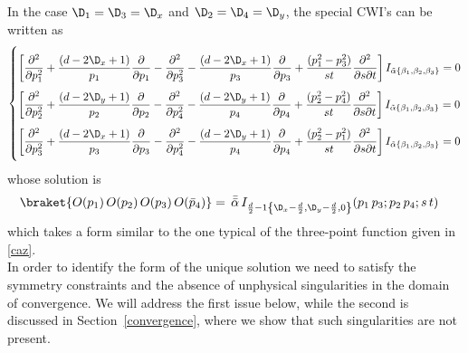 \documentclass[a4paper,11pt,openright,twoside]{book}
\let\a=\alpha   \let\b=\beta   \let\g=\gamma   \let\d=\delta
\newcommand{\secref}[1]{Section~\ref{#1}}		%
\numberwithin{equation}{section}
\begin{document}
{In the case $\D_1=\D_3=\D_x$ and $\D_2=\D_4=\D_y$, the special CWI's can be written as
\begin{equation}
	\left\{\begin{aligned}&\\[-1.9ex]
		&\bigg [\frac{\partial^2}{\partial p_1^2}+\frac{(d-2\D_x+1)}{p_1}\frac{\partial}{\partial p_1}-\frac{\partial^2}{\partial p_3^2}-\frac{(d-2\D_x+1)}{p_3}\frac{\partial}{\partial p_3}+\frac{(p_1^2-p_3^2)}{st}\frac{\partial^2}{\partial s\partial t}\bigg ]\,I_{\tilde\a\{\b_1,\b_2,\b_3\}}=0\\[1ex]
		&\bigg[\frac{\partial^2}{\partial p_2^2}+\frac{(d-2\D_y+1)}{p_2}\frac{\partial}{\partial p_2}-\frac{\partial^2}{\partial p_4^2}-\frac{(d-2\D_y+1)}{p_4}\frac{\partial}{\partial p_4}+\frac{(p_2^2-p_4^2)}{st}\frac{\partial^2}{\partial s\partial t}\bigg ]\,I_{\tilde\a\{\b_1,\b_2,\b_3\}}=0\\[1ex]
		&\bigg[\frac{\partial^2}{\partial p_3^2}+\frac{(d-2\D_x+1)}{p_3}\frac{\partial}{\partial p_3}-\frac{\partial^2}{\partial p_4^2}-\frac{(d-2\D_y+1)}{p_4}\frac{\partial}{\partial p_4}+\frac{(p_2^2-p_1^2)}{st}\frac{\partial^2}{\partial s\partial t}\bigg ]\,I_{\tilde\a\{\b_1,\b_2,\b_3\}}=0\\[1.3ex]
	\end{aligned}\right.
\end{equation}
whose solution is
\begin{align}
	\label{ssm1}
	\braket{O(p_1)\,O(p_2)\,O(p_3)\,O(\bar{p}_4)}&=\,\bar{\bar{\a}} \,I_{\frac{d}{2}-1\left\{\D_x-\frac{d}{2},\D_y-\frac{d}{2},0\right\}}(p_1\, p_3;p_2\,p_4; s\,t)
\end{align}
which takes a form similar to the one typical of the three-point function given in \eqref{caz}.\\
In order to identify the form of the unique solution we need to satisfy the symmetry constraints and the absence of unphysical singularities \cite{Bzowski:2013sza} in the domain of convergence. We will address the first issue below, while the second is discussed in \secref{convergence}, where we show that such singularities are not present. 

}
\end{document}
